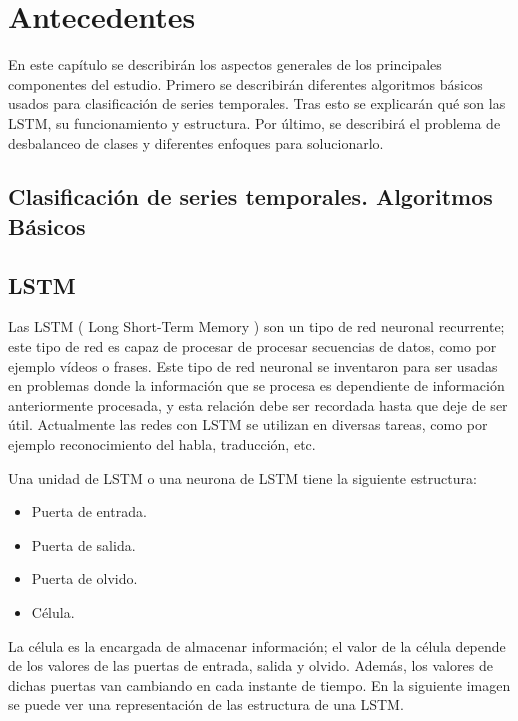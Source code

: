 \chapter{Antecedentes}
En este capítulo se describirán los aspectos generales de los principales componentes del estudio. Primero se describirán diferentes algoritmos básicos usados para clasificación de series temporales. Tras esto se explicarán qué son las LSTM, su funcionamiento y estructura. Por último, se describirá el problema de desbalanceo de clases y diferentes enfoques para solucionarlo.\newline

\section{Clasificación de series temporales. Algoritmos Básicos}
\newpage
\section{LSTM}
Las LSTM ( Long Short-Term Memory ) son un tipo de red neuronal recurrente; este tipo de red es capaz de procesar de procesar secuencias de datos, como por ejemplo vídeos o frases. Este tipo de red neuronal se inventaron para ser usadas en problemas donde la información que se procesa es dependiente de información anteriormente procesada, y esta relación debe ser recordada hasta que deje de ser útil. Actualmente las redes con LSTM se utilizan en diversas tareas, como por ejemplo reconocimiento del habla, traducción, etc.\newline

Una unidad de LSTM o una neurona de LSTM tiene la siguiente estructura:
\begin{itemize}
	\item Puerta de entrada.
	\item Puerta de salida.
	\item Puerta de olvido.
	\item Célula.
\end{itemize}
\vspace{0.09in}
La célula es la encargada de almacenar información; el valor de la célula depende de los valores de las puertas de entrada, salida y olvido. Además, los valores de dichas puertas van cambiando en cada instante de tiempo. En la siguiente imagen se puede ver una representación de las estructura de una LSTM.\newline

